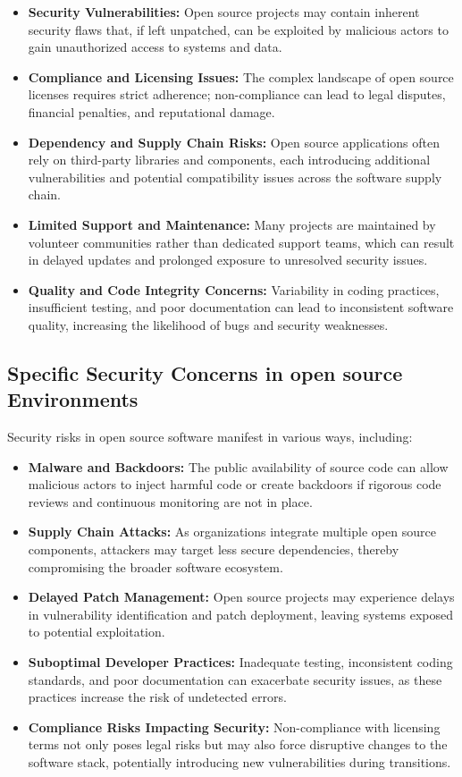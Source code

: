 \begin{itemize}
    \item \textbf{Security Vulnerabilities:} Open source projects may contain inherent security flaws that, if left unpatched, can be exploited by malicious actors to gain unauthorized access to systems and data.
    \item \textbf{Compliance and Licensing Issues:} The complex landscape of open source licenses requires strict adherence; non-compliance can lead to legal disputes, financial penalties, and reputational damage.
    \item \textbf{Dependency and Supply Chain Risks:} Open source applications often rely on third-party libraries and components, each introducing additional vulnerabilities and potential compatibility issues across the software supply chain.
    \item \textbf{Limited Support and Maintenance:} Many projects are maintained by volunteer communities rather than dedicated support teams, which can result in delayed updates and prolonged exposure to unresolved security issues.
    \item \textbf{Quality and Code Integrity Concerns:} Variability in coding practices, insufficient testing, and poor documentation can lead to inconsistent software quality, increasing the likelihood of bugs and security weaknesses.
\end{itemize}

\cite{OpenSource-Software-Risks-Disadvantages}

\subsection{Specific Security Concerns in open source Environments}

Security risks in open source software manifest in various ways, including:

\begin{itemize}
    \item \textbf{Malware and Backdoors:} The public availability of source code can allow malicious actors to inject harmful code or create backdoors if rigorous code reviews and continuous monitoring are not in place.
    \item \textbf{Supply Chain Attacks:} As organizations integrate multiple open source components, attackers may target less secure dependencies, thereby compromising the broader software ecosystem.
    \item \textbf{Delayed Patch Management:} Open source projects may experience delays in vulnerability identification and patch deployment, leaving systems exposed to potential exploitation.
    \item \textbf{Suboptimal Developer Practices:} Inadequate testing, inconsistent coding standards, and poor documentation can exacerbate security issues, as these practices increase the risk of undetected errors.
    \item \textbf{Compliance Risks Impacting Security:} Non-compliance with licensing terms not only poses legal risks but may also force disruptive changes to the software stack, potentially introducing new vulnerabilities during transitions.
\end{itemize}

